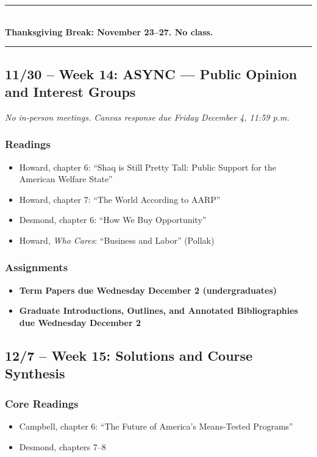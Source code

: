 \documentclass[12pt]{article}
\begin{document}
\begin{center}
\vspace{0.5em}
\noindent\rule{0.5\textwidth}{0.4pt}\\[0.25em]
\textbf{Thanksgiving Break: November 23--27. No class.}\\[0.25em]
\noindent\rule{0.5\textwidth}{0.4pt}
\vspace{0.5em}
\end{center}

\subsection*{11/30 -- Week 14: \textbf{ASYNC} --- Public Opinion and Interest Groups}
\emph{No in-person meetings. Canvas response due Friday December 4, 11:59 p.m.}
    \subsubsection*{Readings}
        \begin{itemize}
            \item Howard, chapter 6: ``Shaq is Still Pretty Tall: Public Support for the American Welfare State''
            \item Howard, chapter 7: ``The World According to AARP''
            \item Desmond, chapter 6: ``How We Buy Opportunity''
            \item Howard, \emph{Who Cares}: ``Business and Labor'' (Pollak)
        \end{itemize}
    \subsubsection*{Assignments}
        \begin{itemize}
            \item \textbf{Term Papers due Wednesday December 2 (undergraduates)}
            \item \textbf{Graduate Introductions, Outlines, and Annotated Bibliographies due Wednesday December 2}
        \end{itemize}

\subsection*{12/7 -- Week 15: Solutions and Course Synthesis}
    \subsubsection*{Core Readings}
        \begin{itemize}
            \item Campbell, chapter 6: ``The Future of America's Means-Tested Programs''
            \item Desmond, chapters 7--8
        \end{itemize}
\end{document}
